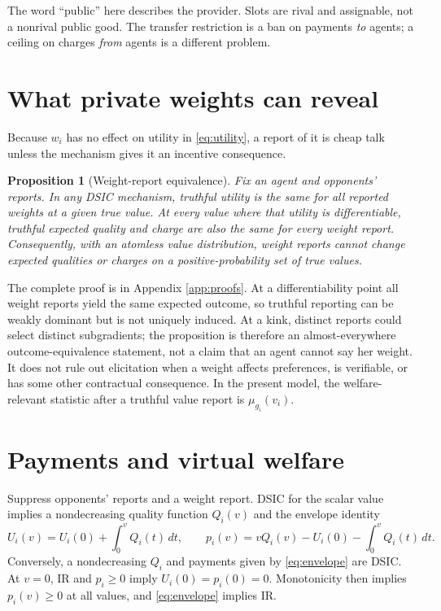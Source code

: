\documentclass[11pt]{article}
\newtheorem{proposition}{Proposition}
\begin{document}
The word ``public'' here describes the provider. Slots are rival and assignable, not a nonrival public good. The transfer restriction is a ban on payments \emph{to} agents; a ceiling on charges \emph{from} agents is a different problem.

\section{What private weights can reveal}\label{sec:weights}

Because $w_i$ has no effect on utility in \eqref{eq:utility}, a report of it is cheap talk unless the mechanism gives it an incentive consequence.

\begin{proposition}[Weight-report equivalence]\label{prop:weights}
Fix an agent and opponents' reports. In any DSIC mechanism, truthful utility is the same for all reported weights at a given true value. At every value where that utility is differentiable, truthful expected quality and charge are also the same for every weight report. Consequently, with an atomless value distribution, weight reports cannot change expected qualities or charges on a positive-probability set of true values.
\end{proposition}

The complete proof is in Appendix \ref{app:proofs}. At a differentiability point all weight reports yield the same expected outcome, so truthful reporting can be weakly dominant but is not uniquely induced. At a kink, distinct reports could select distinct subgradients; the proposition is therefore an almost-everywhere outcome-equivalence statement, not a claim that an agent cannot say her weight. It does not rule out elicitation when a weight affects preferences, is verifiable, or has some other contractual consequence. In the present model, the welfare-relevant statistic after a truthful value report is $\mu_{g_i}(v_i)$.

\section{Payments and virtual welfare}\label{sec:score}

Suppress opponents' reports and a weight report. DSIC for the scalar value implies a nondecreasing quality function $Q_i(v)$ and the envelope identity
\begin{equation}\label{eq:envelope}
U_i(v)=U_i(0)+\int_0^v Q_i(t)\,dt,
\qquad
p_i(v)=vQ_i(v)-U_i(0)-\int_0^vQ_i(t)\,dt.
\end{equation}
Conversely, a nondecreasing $Q_i$ and payments given by \eqref{eq:envelope} are DSIC. At $v=0$, IR and $p_i\ge0$ imply $U_i(0)=p_i(0)=0$. Monotonicity then implies $p_i(v)\ge0$ at all values, and \eqref{eq:envelope} implies IR.
\end{document}
